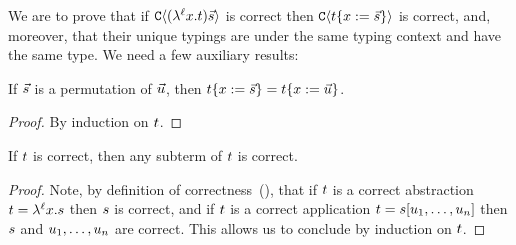 %
%      






We are to prove that
if $\mathtt{C}\langle(\lambda^{\ell} x. t)\vec{s}\rangle$ is correct
then $\mathtt{C}\langle t\{x := \vec{s}\}\rangle$ is correct,
and, moreover, that their unique typings are under the same typing context
and have the same type.
We need a few auxiliary results:

\begin{lemma}
If $\vec{s}$ is a permutation of $\vec{u}$, then $t\{x := \vec{s}\} = t\{x := \vec{u}\}$.
\end{lemma}
\begin{proof}
By induction on $t$.
\end{proof}

\begin{lemma}
If $t$ is correct, then any subterm of $t$ is correct.
\end{lemma}
\begin{proof}
Note, by definition of correctness~(),
that if $t$ is a correct abstraction $t = \lambda^{\ell} x. s$ then $s$ is correct,
and if $t$ is a correct application $t = s[u_1,\hdots,u_n]$
then $s$ and $u_1,\hdots,u_n$ are correct.
This allows us to conclude by induction on $t$.
\end{proof}

